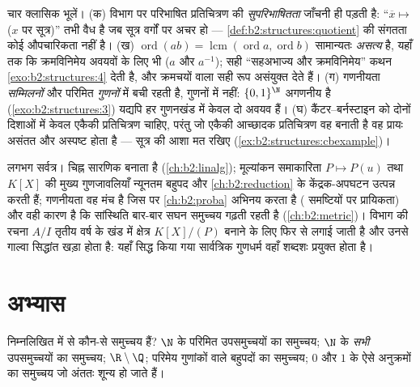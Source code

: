 \begin{remark}[सामान्य भूलें]\label{rem:b2:structures:pitfalls}
चार क्लासिक भूलें। (क) विभाग पर परिभाषित प्रतिचित्रण की
\emph{सुपरिभाषितता} जाँचनी ही पड़ती है: ``$\overline x \mapsto$ ($x$ पर सूत्र)'' तभी वैध
है जब सूत्र वर्गों पर अचर हो --- \cref{def:b2:structures:quotient} की संगतता कोई औपचारिकता नहीं है।
(ख) $\operatorname{ord}(ab) =
\operatorname{lcm}(\operatorname{ord}a, \operatorname{ord}b)$ सामान्यतः \emph{असत्य} है, यहाँ तक कि क्रमविनिमेय अवयवों के
लिए भी ($a$ और $a^{-1}$); सही ``सहअभाज्य और क्रमविनिमेय'' कथन \cref{exo:b2:structures:4} देती है,
और क्रमचयों वाला सही रूप असंयुक्त  देते हैं। (ग) गणनीयता 
\emph{सम्मिलनों} और परिमित \emph{गुणनों} में बची रहती है,  गुणनों
में नहीं: $\{0,1\}^{\N}$ अगणनीय है (\cref{exo:b2:structures:3}) यद्यपि हर गुणनखंड में केवल दो अवयव हैं।
(घ) कैंटर--बर्नस्टाइन को दोनों दिशाओं में केवल एकैकी प्रतिचित्रण
चाहिए, परंतु जो एकैकी आच्छादक प्रतिचित्रण वह बनाती है वह प्रायः असंतत
और अस्पष्ट होता है --- सूत्र की आशा मत रखिए (\cref{ex:b2:structures:cbexample})।
\end{remark}

\begin{remark}[यह अध्याय कहाँ काम आता है]
लगभग सर्वत्र। चिह्न सारणिक बनाता है (\cref{ch:b2:linalg}); मूल्यांकन समाकारिता $P \mapsto P(u)$
तथा $K[X]$ की मुख्य गुणजावलियाँ न्यूनतम बहुपद और \cref{ch:b2:reduction} के केंद्रक-अपघटन
उत्पन्न करती हैं; गणनीयता वह मंच है जिस पर \cref{ch:b2:proba} अभिनय करता है (
समष्टियों पर प्रायिकता) और वही कारण है कि सांस्थिति बार-बार  सघन
समुच्चय गढ़ती रहती है (\cref{ch:b2:metric})। विभाग की रचना $A/I$ तृतीय वर्ष के खंड में
क्षेत्र $K[X]/(P)$ बनाने के लिए फिर से लगाई जाती है और उनसे गाल्वा सिद्धांत
खड़ा होता है: यहाँ सिद्ध किया गया सार्वत्रिक गुणधर्म वहाँ शब्दशः
प्रयुक्त होता है।
\end{remark}

\section{अभ्यास}

\begin{exercise}[$\star$]\label{exo:b2:structures:1}
निम्नलिखित में से कौन-से समुच्चय  हैं? $\N$ के परिमित उपसमुच्चयों
का समुच्चय; $\N$ के \emph{सभी} उपसमुच्चयों का समुच्चय; $\R \setminus \Q$; परिमेय
गुणांकों वाले बहुपदों का समुच्चय; $0$ और $1$ के ऐसे अनुक्रमों का
समुच्चय जो अंततः शून्य हो जाते हैं।
\end{exercise}

